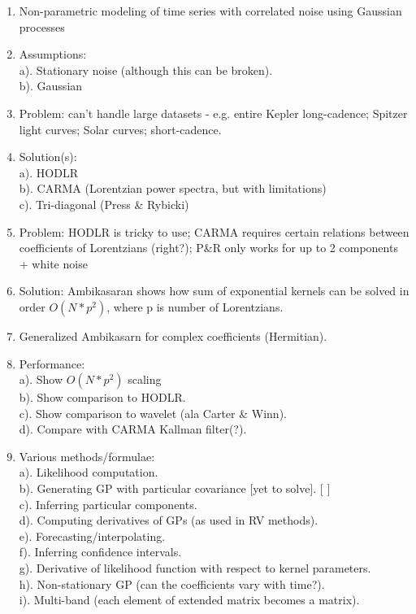 \documentclass[manuscript, letterpaper]{aastex6}
\begin{document}
\begin{enumerate}
\item Non-parametric modeling of time series with correlated noise using Gaussian processes
\item Assumptions:\\
  a). Stationary noise (although this can be broken).\\
  b). Gaussian
\item Problem: can't handle large datasets - e.g. entire Kepler long-cadence; Spitzer light
   curves; Solar curves; short-cadence.
\item Solution(s):\\
  a). HODLR \citep{Ambikasaran2013,Ambikasaran2016}\\
  b). CARMA (Lorentzian power spectra, but with limitations) \citep{Kelly2014}\\
  c). Tri-diagonal (Press \& Rybicki) \citep{1995PhRvL..74.1060R}
\item Problem: HODLR is tricky to use; CARMA requires certain relations between
  coefficients of Lorentzians (right?); P\&R only works for up to 2 components + white noise
\item Solution: Ambikasaran \citep{Ambikasaran2015} shows how sum of exponential kernels can be solved in order
   $O(N*p^2)$, where p is number of Lorentzians.
\item Generalized Ambikasarn for complex coefficients (Hermitian).
\item Performance:\\
  a). Show $O(N*p^2)$ scaling\\
  b). Show comparison to HODLR.\\
  c). Show comparison to wavelet (ala Carter \& Winn).\\
  d). Compare with CARMA Kallman filter(?).
\item Various methods/formulae:\\
  a). Likelihood computation.\\
  b). Generating GP with particular covariance [yet to solve]. [ ]\\
  c). Inferring particular components.\\
  d). Computing derivatives of GPs (as used in RV methods).\\
  e). Forecasting/interpolating.\\
  f). Inferring confidence intervals.\\
  g). Derivative of likelihood function with respect to kernel parameters.\\
  h). Non-stationary GP (can the coefficients vary with time?).\\
  i). Multi-band (each element of extended matrix becomes a matrix).


\end{enumerate}
\end{document}
